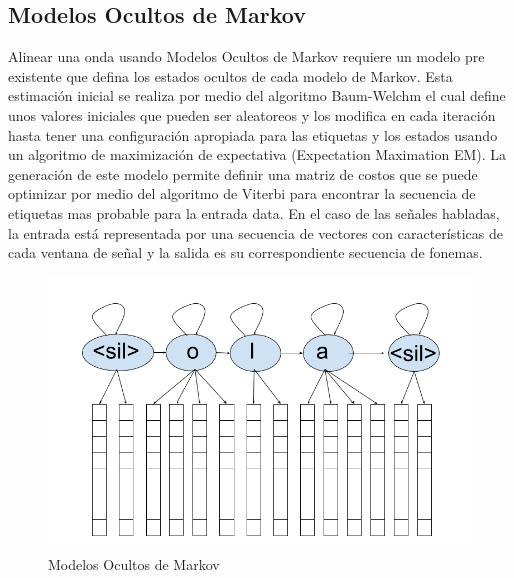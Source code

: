 \subsection{Modelos Ocultos de Markov}

Alinear una onda usando Modelos Ocultos de Markov requiere un modelo pre existente que defina los estados ocultos de cada modelo de Markov. Esta estimación inicial se realiza por medio del algoritmo Baum-Welchm el cual define unos valores iniciales que pueden ser aleatoreos y los modifica en cada iteración hasta tener una configuración apropiada para las etiquetas y los estados usando un algoritmo de maximización de expectativa (Expectation Maximation EM). La generación de este modelo permite definir una matriz de costos que se puede optimizar por medio del algoritmo de Viterbi para encontrar la secuencia de etiquetas mas probable para la entrada data. En el caso de las señales habladas, la entrada está representada por una secuencia de vectores con características de cada ventana de señal y la salida es su correspondiente secuencia de fonemas.

\begin{figure}[H]

\centering
\caption{Modelos Ocultos de Markov}
\label{img:hmm}
\includegraphics[scale=0.50]{images/hmm.png}
\end{figure}

